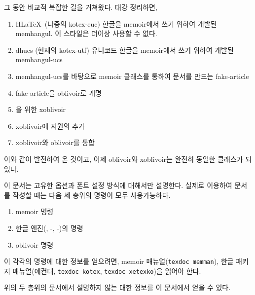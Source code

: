 \documentclass[
	12pt,
	a4paper,
	kosection,
	footnote,
	nobookmarks,
	microtype,
]{oblivoir}
\newcommand\obclass{ob\-liv\-oir\oblivoirallowbreak}
\begin{document}
그 동안  비교적 복잡한 길을 거쳐왔다. 대강 정리하면,
\begin{enumerate}[(1)]\tightlist
\item H\LaTeX\ (나중의 kotex-euc) 한글을 memoir에서 쓰기 위하여 개발된 memhangul. 이 스타일은 더이상 사용할 수 없다.
\item dhucs (현재의 kotex-utf) 유니코드 한글을 memoir에서 쓰기 위하여 개발된 memhangul-ucs
\item memhangul-ucs를 바탕으로 memoir 클래스를 통하여 문서를 만드는 fake-article
\item fake-article을 oblivoir로 개명
\item {}을 위한 xoblivoir
\item xoblivoir에  지원의 추가
\item xoblivoir와 oblivoir를 통합
\end{enumerate}
이와 같이 발전하여 온 것이고, 이제 oblivoir와 xoblivoir는 완전히 동일한 클래스가 되었다.

이 문서는  고유한 옵션과 폰트 설정 방식에 대해서만 설명한다. 실제로 
이용하여 문서를 작성할 때는 다음 세 층위의 명령이 모두 사용가능하다.
\begin{enumerate}[(1)]\tightlist
\item memoir 명령
\item 한글 엔진(\koTeX, \XeTeX-\ko, \LuaTeX-\ko)의 명령
\item oblivoir 명령
\end{enumerate}

이 각각의 명령에 대한 정보를 얻으려면, memoir 매뉴얼(\texttt{texdoc memman}), 
한글 패키지 매뉴얼(예컨대, \texttt{texdoc kotex}, \texttt{texdoc xetexko})을
읽어야 한다.

위의 두 층위의 문서에서 설명하지 않는  대한 정보를 이 문서에서 얻을 수 있다.
\end{document}
